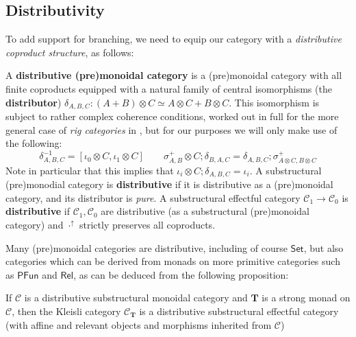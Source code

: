 \documentclass[acmsmall,screen,review]{acmart}
\newcommand{\mc}[1]{\ensuremath{\mathcal{#1}}}
\newcommand{\mb}[1]{\ensuremath{\mathbf{#1}}}
\newcommand{\ms}[1]{\ensuremath{\mathsf{#1}}}
\newcommand{\upg}[2]{{#1}^{\uparrow #2}}
\begin{document}
\subsection{Distributivity}

To add support for branching, we need to equip our category with a
\textit{distributive coproduct structure}, as follows:
\begin{definition} 
  A \textbf{distributive (pre)monoidal category} is a (pre)monoidal category
  with all finite coproducts equipped with a natural family of central
  isomorphisms (the \textbf{distributor}) \(\delta_{A, B, C}: (A + B) \otimes C
  \simeq A \otimes C + B \otimes C\). This isomorphism is subject to rather
  complex coherence conditions, worked out in full for the more general case of
  \textit{rig categories} in \cite{laplaza-distributivity}, but for our purposes
  we will only make use of the following:
  \begin{equation*}
    \delta_{A, B, C}^{-1} = [\iota_0 \otimes C, \iota_1 \otimes C] 
    \qquad
    \sigma^+_{A, B} \otimes C;\delta_{B, A, C} = \delta_{A, B, C};\sigma^+_{A \otimes C, B \otimes C}
  \end{equation*}
  Note in particular that this implies that \(\iota_i \otimes C;\delta_{A, B, C}
  = \iota_i\). A substructural (pre)monodial category is \textbf{distributive}
  if it is distributive as a (pre)monoidal category, and its distributor is
  \textit{pure}. A substructural effectful category \(\mc{C}_1 \to \mc{C}_0\) is
  \textbf{distributive} if \(\mc{C}_1, \mc{C}_0\) are distributive (as a
  substructural (pre)monoidal category) and \(\upg{\cdot}{}\) strictly preserves
  all coproducts.
\end{definition}
Many (pre)monoidal categories are distributive, including of course
\(\ms{Set}\), but also categories which can be derived from monads on more
primitive categories such as \(\ms{PFun}\) and \(\ms{Rel}\), as can be deduced
from the following proposition:
\begin{proposition}
  If \(\mc{C}\) is a distributive substructural monoidal category and \(\mb{T}\)
  is a strong monad on \(\mc{C}\), then the Kleisli category \(\mc{C}_{\mb{T}}\)
  is a distributive substructural effectful category (with affine and relevant
  objects and morphisms inherited from \(\mc{C}\))
\end{proposition}
\end{document}
